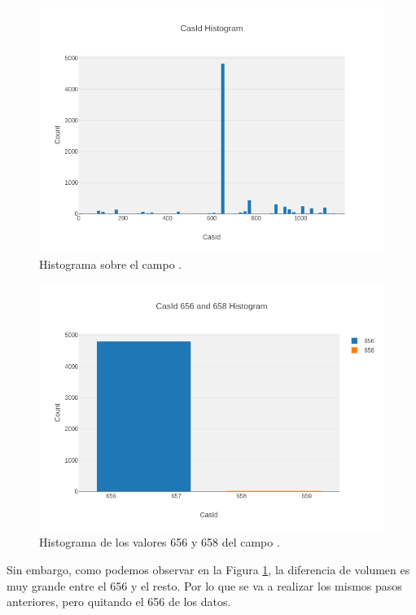 \newpage
\begin{figure}[!th]
\includegraphics[scale=0.5]{figures/histogram-casid-basic}
\centering
\caption{Histograma sobre el campo .}
\label{fig:histogram-casid-basic}
\end{figure}

\begin{figure}[!th]
\includegraphics[scale=0.5]{figures/histogram-casid-656-658}
\centering
\caption{Histograma de los valores 656 y 658 del campo .}
\label{fig:histogram-casid-656-658}
\end{figure}


Sin embargo, como podemos observar en la Figura \ref{fig:histogram-casid-basic}, la diferencia de volumen es muy grande entre el  656 y el resto. Por lo que se va a realizar los mismos pasos anteriores, pero quitando el  656 de los datos. \\

